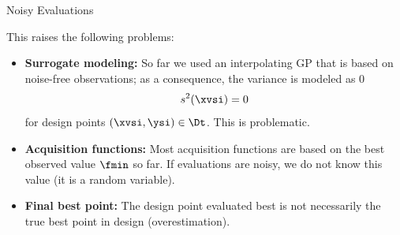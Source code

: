 \documentclass[11pt,compress,t,notes=noshow, xcolor=table]{beamer}
\begin{document}
\begin{frame}{Noisy Evaluations} 

This raises the following problems: 

\begin{itemize}
  \item \textbf{Surrogate modeling:} So far we used an interpolating GP that is based on noise-free observations; as a consequence, the variance is modeled as $0$
  $$
    s^2(\xvsi) = 0
  $$
  for design points $(\xvsi, \ysi) \in \Dt$. This is problematic. 
  \item \textbf{Acquisition functions:} Most acquisition functions are based on the best observed value $\fmin$ so far. If evaluations are noisy, we do not know this value (it is a random variable).
  \item \textbf{Final best point:} The design point evaluated best is not necessarily the true best point in design (overestimation). 
\end{itemize}


\end{frame}
\end{document}
